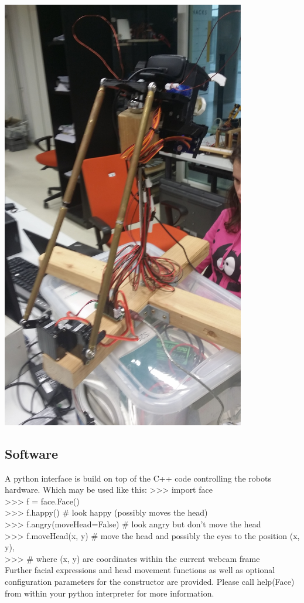 \documentclass[12.5pt]{scrartcl}
\begin{document}
	\begin{center}
        \includegraphics[width=0.8\textwidth,height=0.2\textheight,keepaspectratio]{images/RoboFaceBack.jpg}
		\label{fig:RoboFaceBack}
	\end{center}

	\subsection{Software}
	A python interface is build on top of the C++ code controlling the robots hardware. Which may be used like this:
	>>> import face \\
	>>> f = face.Face()\\
    >>> f.happy() \# look happy (possibly moves the head)\\
	>>> f.angry(moveHead=False) \# look angry but don't move the head\\
    >>> f.moveHead(x, y) \# move the head and possibly the eyes to the position (x, y),\\
    >>> \# where (x, y) are coordinates within the current webcam frame\\
    Further facial expressions and head movement functions as well as optional configuration parameters
    for the constructor are provided. Please call help(Face) from within your python interpreter for more information.
\end{document}
